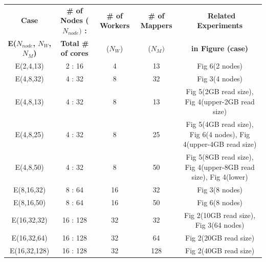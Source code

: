 \documentclass{acm_proc_article-sp}
\begin{document}
\begin{center}
\begin{table}[ht]
\small
\hfill{}
 \begin{tabular}{|c|c|c|c|c|} 
 \hline 

 \textbf{Case} &  \textbf{ \# of  Nodes ($N_{node})$ :}  &  \textbf{\# of Workers} &   \textbf{\# of Mappers} & \  \textbf{Related Experiments} \\
 \textbf{E($N_{node}$, $N_W$,  $N_M$)} &  \textbf{Total \# of cores} &   ($N_W$)  & ($N_M)$  &  \textbf{ in Figure (case)}  \\
 \hline
  \hline
E(2,4,13) &2 : 16 & 4 & 13 & Fig 6(2 nodes) \\
E(4,8,32) & 4 : 32 & 8 & 32 & Fig 3(4 nodes) \\
E(4,8,13) & 4 : 32 & 8 & 13 & Fig 5(2GB read size), Fig 4(upper-2GB read size) \\
E(4,8,25) & 4 : 32 & 8 & 25 & Fig 5(4GB read size), Fig 6(4 nodes), Fig 4(upper-4GB read size) \\ 
E(4,8,50) & 4 : 32 & 8 & 50 & Fig 5(8GB read size), Fig 4(upper-8GB read size), Fig 4(lower)\\ 
E(8,16,32) & 8 : 64 & 16 & 32 & Fig 3(8 nodes)\\ 
E(8,16,50) & 8 : 64& 16 & 50 & Fig 6(8 nodes)\\ 
E(16,32,32) & 16 : 128 & 32 & 32 & Fig 2(10GB read size), Fig 3(64 nodes)\\ 
E(16,32,64) & 16 : 128 & 32 & 64 & Fig 2(20GB read size)\\ 
E(16,32,128) & 16 : 128 & 32 & 128 & Fig 2(40GB read size)\\ 


 \hline
 \end{tabular}
 \hfill{}



\end{table}
\end{center}
\end{document}
